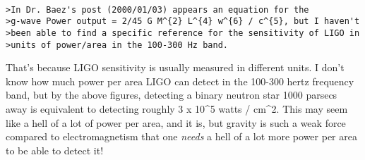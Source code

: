 \begin{verbatim}

>In Dr. Baez's post (2000/01/03) appears an equation for the
>g-wave Power output = 2/45 G M^{2} L^{4} w^{6} / c^{5}, but I haven't 
>been able to find a specific reference for the sensitivity of LIGO in
>units of power/area in the 100-300 Hz band. 
\end{verbatim}
    

That's because LIGO sensitivity is usually measured in different 
units.  I don't know how much power per area LIGO can detect in 
the 100-300 hertz frequency band, but by the above figures, detecting 
a binary neutron star 1000 parsecs away is equivalent to detecting 
roughly 3 x 10^{5} watts / cm^{2}.  This may seem like a hell of a lot of 
power per area, and it is, but gravity is such a weak force compared 
to electromagnetism that one \emph{needs} a hell of a lot more power per 
area to be able to detect it!   


